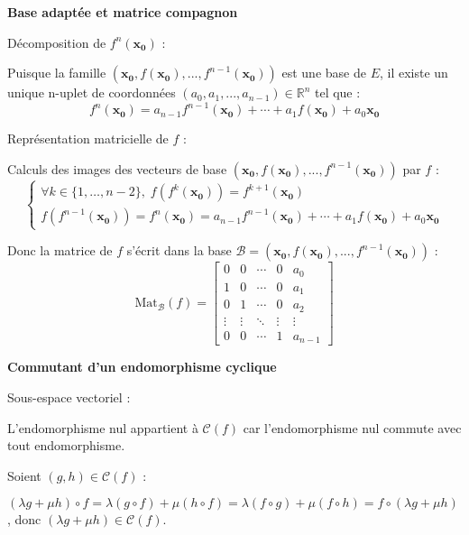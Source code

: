 \documentclass[10pt,a4paper]{article}
\begin{document}
\bigskip
\textbf{Base adaptée et matrice compagnon}

\q Décomposition de $f^n(\mathbf{x_0})$ :

Puisque la famille \((\mathbf{x_0}, f(\mathbf{x_0}), ..., f^{n-1}(\mathbf{x_0}))\) est une base de
\(E\), il existe un unique n-uplet de coordonnées \((a_0, a_1, ..., a_{n-1}) \in \mathbb{R}^n\) tel
que :
\[
f^n(\mathbf{x_0}) = a_{n-1}f^{n-1}(\mathbf{x_0}) + \cdots + a_1 f(\mathbf{x_0}) + a_0 \mathbf{x_0}
\]

\q Représentation matricielle de \(f\) :

Calculs des images des vecteurs de base \((\mathbf{x_0}, f(\mathbf{x_0}), ...,
f^{n-1}(\mathbf{x_0}))\) par \(f\) :
\[
\begin{cases}
\forall k \in \{ 1, \dots, n-2 \},\; f(f^k(\mathbf{x_0})) = f^{k+1}(\mathbf{x_0}) \\
f(f^{n-1}(\mathbf{x_0})) = f^n(\mathbf{x_0}) = a_{n-1}f^{n-1}(\mathbf{x_0}) + \cdots + a_1 f(\mathbf{x_0}) + a_0 \mathbf{x_0}
\end{cases}
\]

Donc la matrice de \(f\) s'écrit dans la base \(\mathcal{B} = (\mathbf{x_0}, f(\mathbf{x_0}), ...,
f^{n-1}(\mathbf{x_0}))\) :
\[
\mathrm{Mat}_{\mathcal{B}}(f) = \begin{bmatrix}
0 & 0 & \cdots & 0 & a_0 \\
1 & 0 & \cdots & 0 & a_1 \\
0 & 1 & \cdots & 0 & a_2 \\
\vdots & \vdots & \ddots & \vdots & \vdots \\
0 & 0 & \cdots & 1 & a_{n-1}
\end{bmatrix}
\]

\bigskip
\textbf{Commutant d'un endomorphisme cyclique}

\q Sous-espace vectoriel :

L'endomorphisme nul appartient à \(\mathcal{C}(f)\) car l'endomorphisme nul commute avec tout
endomorphisme.

Soient \((g, h) \in \mathcal{C}(f)\) :

\((\lambda g + \mu h) \circ f = \lambda (g \circ f) + \mu (h\circ f) = \lambda (f \circ g) + \mu
(f\circ h) = f \circ (\lambda g + \mu h)\), donc \((\lambda g + \mu h) \in \mathcal{C}(f)\).
\end{document}
